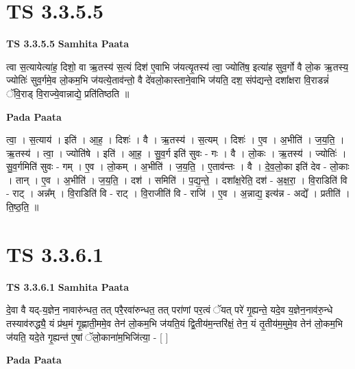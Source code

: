 \documentclass[17pt]{extarticle}
\begin{document}

\section{ TS 3.3.5.5 }

\textbf{TS 3.3.5.5 } \newline
\textbf{Samhita Paata} \newline

त्वा स॒त्यायेत्या॑ह॒ दिशो॒ वा ऋ॒तस्य॑ स॒त्यं दिश॑ ए॒वाभि ज॑यत्यृ॒तस्य॑ त्वा॒ ज्योति॑ष॒ इत्या॑ह सुव॒र्गो वै लो॒क ऋ॒तस्य॒ ज्योतिः॑ सुव॒र्गमे॒व लो॒कम॒भि ज॑यत्ये॒ताव॑न्तो॒ वै दे॑वलो॒कास्ताने॒वाभि ज॑यति॒ दश॒ संप॑द्यन्ते॒ दशा᳚क्षरा वि॒राडन्नं॑ ॅवि॒राड् वि॒राज्ये॒वान्नाद्ये॒ प्रति॑तिष्ठति ॥ \newline

\textbf{Pada Paata} \newline

त्वा॒ । स॒त्याय॑ । इति॑ । आ॒ह॒ । दिशः॑ । वै । ऋ॒तस्य॑ । स॒त्यम् । दिशः॑ । ए॒व । अ॒भीति॑ । ज॒य॒ति॒ । ऋ॒तस्य॑ । त्वा॒ । ज्योति॑षे । इति॑ । आ॒ह॒ । सु॒व॒र्ग इति॑ सुवः - गः । वै । लो॒कः । ऋ॒तस्य॑ । ज्योतिः॑ । सु॒व॒र्गमिति॑ सुवः - गम् । ए॒व । लो॒कम् । अ॒भीति॑ । ज॒य॒ति॒ । ए॒ताव॑न्तः । वै । दे॒व॒लो॒का इति॑ देव - लो॒काः । तान् । ए॒व । अ॒भीति॑ । ज॒य॒ति॒ । दश॑ । समिति॑ । प॒द्य॒न्ते॒ । दशा᳚क्ष॒रेति॒ दश॑ - अ॒क्ष॒रा॒ । वि॒राडिति॑ वि - राट् । अन्न᳚म् । वि॒राडिति॑ वि - राट् । वि॒राजीति॑ वि - राजि॑ । ए॒व । अ॒न्नाद्य॒ इत्य॑न्न - अद्ये᳚ । प्रतीति॑ । ति॒ष्ठ॒ति॒ ॥  \newline





\section{ TS 3.3.6.1 }

\textbf{TS 3.3.6.1 } \newline
\textbf{Samhita Paata} \newline

दे॒वा वै यद्-य॒ज्ञेन॒ नावारु॑न्धत॒ तत् परै॒रवा॑रुन्धत॒ तत् परा॑णां पर॒त्वं ॅयत् परे॑ गृ॒ह्यन्ते॒ यदे॒व य॒ज्ञेन॒नाव॑रु॒न्धे तस्याव॑रुद्ध्यै॒ यं प्र॑थ॒मं गृ॒ह्णाती॒ममे॒व तेन॑ लो॒कम॒भि ज॑यति॒यं द्वि॒तीय॑म॒न्तरि॑क्षं॒ तेन॒ यं तृ॒तीय॑म॒मुमे॒व तेन॑ लो॒कम॒भि ज॑यति॒ यदे॒ते गृ॒ह्यन्त॑ ए॒षां ॅलो॒काना॑म॒भिजि॑त्या॒ - [  ] \newline

\textbf{Pada Paata} \newline
\end{document}
